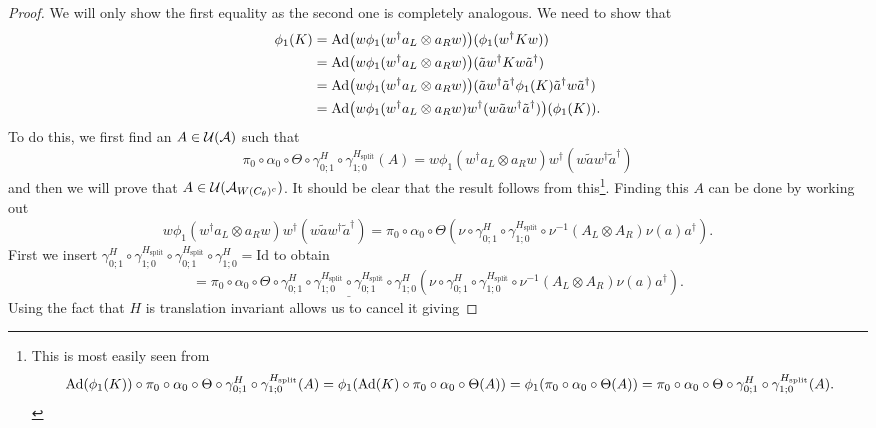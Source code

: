 \documentclass[12pt,a4paper,twoside]{article}
\numberwithin{equation}{section}
\begin{document}
\begin{proof}
	We will only show the first equality as the second one is completely analogous. We need to show that
	\begin{align}
		\phi_1(K)&=\Ad{w\phi_1(w^\dagger a_L\otimes a_R w)}(\phi_1(w^\dagger K w))\\
		&=\Ad{w\phi_1(w^\dagger a_L\otimes a_R w)}(\tilde{a}w^\dagger K w\tilde{a}^\dagger)\\
		&=\Ad{w\phi_1(w^\dagger a_L\otimes a_R w)}(\tilde{a}w^\dagger \tilde{a}^\dagger \phi_1(K) \tilde{a}^\dagger w\tilde{a}^\dagger)\\
		&=\Ad{w\phi_1(w^\dagger a_L\otimes a_R w)w^\dagger (w \tilde{a}w^\dagger \tilde{a}^\dagger)}(\phi_1(K)).
	\end{align}
	To do this, we first find an $A\in\mathcal U(\mathcal A)$ such that
	\begin{equation}
		\pi_0\circ\alpha_0\circ\Theta\circ\gamma^H_{0;1}\circ\gamma^{H_\text{split}}_{1;0}(A)=w\phi_1(w^\dagger a_L\otimes a_R w)w^\dagger (w \tilde{a}w^\dagger \tilde{a}^\dagger)
	\end{equation}
	and then we will prove that $A\in\mathcal U(\mathcal A_{W(C_\theta)^c})$. It should be clear that the result follows from this\footnote{This is most easily seen from\begin{equation}
			\Ad{\phi_1(K)}\circ\pi_0\circ\alpha_0\circ\Theta\circ\gamma^H_{0;1}\circ\gamma^{H_\text{split}}_{1;0}(A)=\phi_1(\Ad{K}\circ\pi_0\circ\alpha_0\circ\Theta(A))=\phi_1(\pi_0\circ\alpha_0\circ\Theta(A))=\pi_0\circ\alpha_0\circ\Theta\circ\gamma^H_{0;1}\circ\gamma^{H_\text{split}}_{1;0}(A).
	\end{equation}}. Finding this $A$ can be done by working out
	\begin{equation}
		w\phi_1(w^\dagger a_L\otimes a_R w)w^\dagger (w \tilde{a}w^\dagger \tilde{a}^\dagger)=\pi_0\circ\alpha_0\circ\Theta\left(\nu\circ\gamma^H_{0;1}\circ\gamma^{H_\text{split}}_{1;0}\circ\nu^{-1}(A_L\otimes A_R)\nu(a)a^\dagger\right).
	\end{equation}
	First we insert $\gamma^H_{0;1}\circ\gamma^{H_\text{split}}_{1;0}\circ\gamma^{H_\text{split}}_{0;1}\circ\gamma^H_{1;0}=\text{Id}$ to obtain
	\begin{equation}
		=\pi_0\circ\alpha_0\circ\Theta\circ\underline{\gamma^H_{0;1}\circ\gamma^{H_\text{split}}_{1;0}\circ\gamma^{H_\text{split}}_{0;1}\circ\gamma^H_{1;0}}\left(\nu\circ\gamma^H_{0;1}\circ\gamma^{H_\text{split}}_{1;0}\circ\nu^{-1}(A_L\otimes A_R)\nu(a)a^\dagger\right).
	\end{equation}
	Using the fact that $H$ is translation invariant allows us to cancel it giving

\end{proof}
\end{document}
